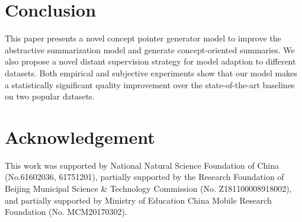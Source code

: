 \documentclass[11pt,a4paper]{article}
\begin{document}
\section{Conclusion}
This paper presents a novel concept pointer generator model to improve the abstractive summarization model and generate concept-oriented summaries. We also propose a novel distant supervision strategy for model adaption to different datasets. Both empirical and subjective experiments show that our model makes a statistically significant quality improvement over the state-of-the-art baselines on two popular datasets.

\section*{Acknowledgement}
This work was supported by National Natural Science Foundation of China (No.61602036, 61751201), partially supported by the Research Foundation of Beijing Municipal Science \& Technology  Commission (No. Z181100008918002), and partially supported by Ministry of Education China Mobile Research Foundation (No. MCM20170302).


 
\end{document}
